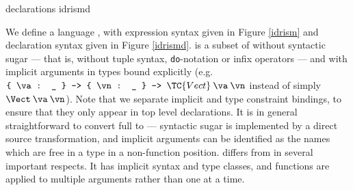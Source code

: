 {\IdrisM{} declarations}
{idrismd}

We define a language \IdrisM{}, with expression syntax given in Figure \ref{idrism}
and declaration syntax given in Figure \ref{idrismd}.
\IdrisM{} is a subset of \Idris{} without syntactic sugar --- that is, without
tuple syntax, \texttt{do}-notation or infix operators --- and with implicit
arguments in types bound explicitly 
(e.g. $\piimp{\va}{\_}\piimp{\vn}{\_}\TC{Vect}\:\va\:\vn$
instead of simply $\Vect\:\va\:\vn$).
Note that we separate implicit and type constraint bindings, to ensure that they
only appear in top level declarations.
It is in general straightforward to
convert full \Idris{} to \IdrisM{} --- syntactic sugar is implemented by a
direct source transformation, and implicit arguments can be identified as the names
which are free in a type in a non-function position.
%
\IdrisM{} differs from \TT{} in several important respects. It has implicit
syntax and type classes, and functions are applied to multiple arguments rather
than one at a time. 

